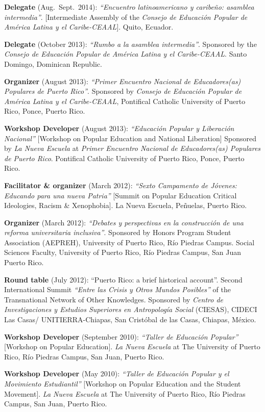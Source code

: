 \documentclass[11pt,a4paper,]{awesome-cv}
\begin{document}
\textbf{Delegate} (Aug.~Sept.~2014): \emph{``Encuentro latinoamericano y
caribeño: asamblea intermedia''}. {[}Intermediate Assembly of the
\emph{Consejo de Educación Popular de América Latina y el
Caribe-CEAAL}{]}. Quito, Ecuador.

\textbf{Delegate} (October 2013): \emph{``Rumbo a la asamblea
intermedia''}. Sponsored by the \emph{Consejo de Educación Popular de
América Latina y el Caribe-CEAAL}. Santo Domingo, Dominican Republic.

\textbf{Organizer} (August 2013): \emph{``Primer Encuentro Nacional de
Educadores(as) Populares de Puerto Rico''}. Sponsored by \emph{Consejo
de Educación Popular de América Latina y el Caribe-CEAAL}, Pontifical
Catholic University of Puerto Rico, Ponce, Puerto Rico.

\textbf{Workshop Developer} (August 2013): \emph{``Educación Popular y
Liberación Nacional''} {[}Workshop on Popular Education and National
Liberation{]} Sponsored by \emph{La Nueva Escuela} at \emph{Primer
Encuentro Nacional de Educadores(as) Populares de Puerto Rico}.
Pontifical Catholic University of Puerto Rico, Ponce, Puerto Rico.

\textbf{Facilitator \& organizer} (March 2012): \emph{``Sexto Campamento
de Jóvenes: Educando para una nueva Patria''} {[}Summit on Popular
Education Critical Ideologies, Racism \& Xenophobia{]}. La Nueva
Escuela, Peñuelas, Puerto Rico.

\textbf{Organizer} (March 2012): \emph{``Debates y perspectivas en la
construcción de una reforma universitaria inclusiva''}. Sponsored by
Honors Program Student Association (AEPREH), University of Puerto Rico,
Río Piedras Campus. Social Sciences Faculty, University of Puerto Rico,
Río Piedras Campus, San Juan Puerto Rico.

\textbf{Round table} (July 2012): ``Puerto Rico: a brief historical
account''. Second International Summit \emph{``Entre las Crisis y Otros
Mundos Posibles''} of the Transnational Network of Other Knowledges.
Sponsored by \emph{Centro de Investigaciones y Estudios Superiores en
Antropología Social} (CIESAS), CIDECI Las Casas/ UNITIERRA-Chiapas, San
Cristóbal de las Casas, Chiapas, México.

\textbf{Workshop Developer} (September 2010): \emph{``Taller de
Educación Popular''} {[}Workshop on Popular Education{]}. \emph{La Nueva
Escuela} at The University of Puerto Rico, Río Piedras Campus, San Juan,
Puerto Rico.

\textbf{Workshop Developer} (May 2010): \emph{``Taller de Educación
Popular y el Movimiento Estudiantil''} {[}Workshop on Popular Education
and the Student Movement{]}. \emph{La Nueva Escuela} at The University
of Puerto Rico, Río Piedras Campus, San Juan, Puerto Rico.
\end{document}
